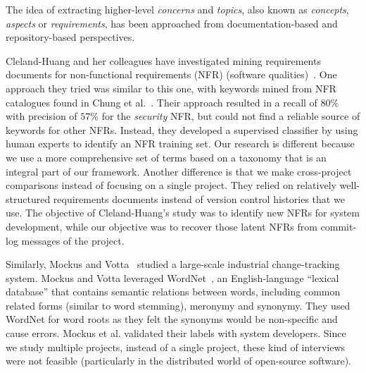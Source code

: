 \documentclass[smallextended]{svjour3}       %
\begin{document}
The idea of extracting higher-level \emph{concerns} and \emph{topics}, also known as
 \emph{concepts}, \emph{aspects} or \emph{requirements},
has been approached from documentation-based and repository-based
perspectives.

Cleland-Huang and her colleagues have investigated mining requirements
documents for non-functional requirements (NFR) (software
qualities)~\cite{Cleland-Huang2006}.  
One approach they tried was similar to this one, with keywords mined from NFR catalogues found in Chung et al.~\cite{chung99}. 
Their approach resulted in a recall of $80\%$ with precision of $57\%$ for the \emph{security} NFR, but could not find a reliable source of keywords for other NFRs. 
Instead, they developed a supervised classifier by using human experts to identify an NFR training set. 
Our research is different because we use a more comprehensive set of terms based on a taxonomy that is an integral part of our framework.
Another difference is that we make cross-project comparisons instead of focusing
on a single project.
They relied on relatively well-structured requirements documents instead of version control histories that we use.
The objective of Cleland-Huang's study was to identify new NFRs for system development, 
while our objective was to recover those latent NFRs from commit-log messages of the project. 


Similarly, Mockus and Votta~\cite{Mockus00} studied a large-scale industrial change-tracking system. 
Mockus and Votta leveraged WordNet~\cite{Fellbaum1998}, an English-language ``lexical database'' that contains semantic relations between words,
including common related forms (similar to word stemming), meronymy and synonymy.
They used WordNet for word roots as they felt the synonyms would be
non-specific and cause errors.
Mockus et al. validated their labels with system developers.
Since we study multiple projects, instead of a single project, these
kind of interviews were not feasible (particularly in the distributed world of open-source software).
\end{document}
